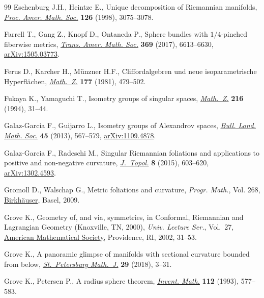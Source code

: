\begin{thebibliography}{99}
Eschenburg J.H., Heintze E., Unique decomposition of {R}iemannian manifolds,
 \href{https://doi.org/10.1090/S0002-9939-98-04630-9}{\textit{Proc. Amer.
 Math. Soc.}} \textbf{126} (1998), 3075--3078.

Farrell T., Gang Z., Knopf D., Ontaneda P., Sphere bundles with {$1/4$}-pinched
 fiberwise metrics, \href{https://doi.org/10.1090/tran/6993}{\textit{Trans.
 Amer. Math. Soc.}} \textbf{369} (2017), 6613--6630,
 \href{http://arxiv.org/abs/1505.03773}{arXiv:1505.03773}.

Ferus D., Karcher H., M\"unzner H.F., Cliffordalgebren und neue
 isoparametrische {H}yperfl\"achen,
 \href{https://doi.org/10.1007/BF01219082}{\textit{Math.~Z.}} \textbf{177}
 (1981), 479--502.

Fukaya K., Yamaguchi T., Isometry groups of singular spaces,
 \href{https://doi.org/10.1007/BF02572307}{\textit{Math.~Z.}} \textbf{216}
 (1994), 31--44.

Galaz-Garcia F., Guijarro L., Isometry groups of {A}lexandrov spaces,
 \href{https://doi.org/10.1112/blms/bds101}{\textit{Bull. Lond. Math. Soc.}}
 \textbf{45} (2013), 567--579,
 \href{http://arxiv.org/abs/1109.4878}{arXiv:1109.4878}.

Galaz-Garcia F., Radeschi M., Singular {R}iemannian foliations and applications
 to positive and non-negative curvature,
 \href{https://doi.org/10.1112/jtopol/jtv004}{\textit{J.~Topol.}} \textbf{8}
 (2015), 603--620, \href{http://arxiv.org/abs/1302.4593}{arXiv:1302.4593}.

Gromoll D., Walschap G., Metric foliations and curvature, \textit{Progr.
 Math.}, Vol. 268,
 \href{https://doi.org/10.1007/978-3-7643-8715-0}{Birkh\"auser}, Basel, 2009.

Grove K., Geometry of, and via, symmetries, in Conformal, {R}iemannian and
 {L}agrangian {G}eometry ({K}noxville, {TN}, 2000), \textit{Univ. Lecture
 Ser.}, Vol.~27, \href{https://doi.org/10.1090/ulect/027/02}{American
 Mathematical Society}, Providence, RI, 2002, 31--53.

Grove K., A panoramic glimpse of manifolds with sectional curvature bounded
 from below, \href{https://doi.org/10.1090/spmj/1479}{\textit{St.~Petersburg
 Math.~J.}} \textbf{29} (2018), 3--31.

Grove K., Petersen P., A radius sphere theorem,
 \href{https://doi.org/10.1007/BF01232447}{\textit{Invent. Math.}}
 \textbf{112} (1993), 577--583.


\end{thebibliography}
